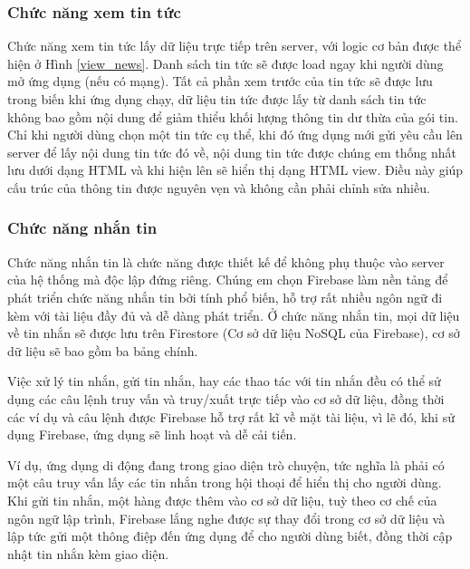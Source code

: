 \subsubsection{Chức năng xem tin tức}

Chức năng xem tin tức lấy dữ liệu trực tiếp trên server, với logic cơ bản được thể hiện ở Hình \ref{view_news}. 
Danh sách tin tức sẽ được load ngay khi người dùng mở ứng dụng (nếu có mạng). Tất cả phần xem trước của tin tức sẽ được lưu
trong biến khi ứng dụng chạy, dữ liệu tin tức được lấy từ danh sách tin tức không bao gồm nội dung để giảm thiểu khối lượng
thông tin dư thừa của gói tin. Chỉ khi người dùng chọn một tin tức cụ thể, khi đó ứng dụng mới gửi yêu cầu lên server để lấy
nội dung tin tức đó về, nội dung tin tức được chúng em thống nhất lưu dưới dạng HTML và khi hiện lên sẽ hiển thị dạng HTML view.
Điều này giúp cấu trúc của thông tin được nguyên vẹn và không cần phải chỉnh sửa nhiều.

\subsubsection{Chức năng nhắn tin}

Chức năng nhắn tin là chức năng được thiết kế để không phụ thuộc vào server của hệ thống mà độc lập đứng riêng. Chúng em
chọn Firebase làm nền tảng để phát triển chức năng nhắn tin bởi tính phổ biến, hỗ trợ rất nhiều ngôn ngữ đi kèm với tài liệu đầy đủ 
và dễ dàng phát triển.
Ở chức năng nhắn tin, mọi dữ liệu về tin nhắn sẽ được lưu trên Firestore (Cơ sở dữ liệu NoSQL của Firebase), cơ sở dữ liệu sẽ
bao gồm ba bảng chính. 

Việc xử lý tin nhắn, gửi tin nhắn, hay các thao tác với tin nhắn đều có thể sử dụng các câu lệnh truy vấn và truy/xuất
trực tiếp vào cơ sở dữ liệu, đồng thời các ví dụ và câu lệnh được Firebase hỗ trợ rất kĩ về mặt tài liệu, vì lẽ đó, khi sử dụng
Firebase, ứng dụng sẽ linh hoạt và dễ cải tiến.

Ví dụ, ứng dụng di động đang trong giao diện trò chuyện, tức nghĩa là phải có một câu truy vấn lấy các tin nhắn trong hội thoại
để hiển thị cho người dùng. Khi gửi tin nhắn, một hàng được thêm vào
cơ sở dữ liệu, tuỳ theo cơ chế của ngôn ngữ lập trình, Firebase lắng nghe được sự thay đổi
trong cơ sở dữ liệu và lập tức gửi một thông điệp đến ứng dụng để cho người dùng biết, đồng thời cập nhật tin nhắn kèm giao diện.

